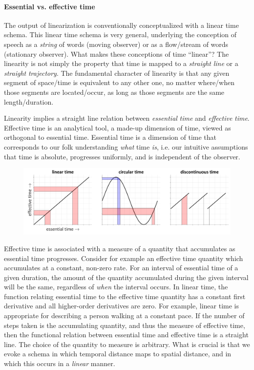 \paragraph{Essential vs. effective time}

The output of linearization is conventionally conceptualized with a linear time schema. This linear time schema is very general, underlying the conception of speech as a \textit{string} of words (moving observer) or as a flow/stream of words (stationary observer). What makes these conceptions of time “linear”?  The linearity is not simply the property that time is mapped to a \textit{straight} \textit{line} or a \textit{straight} \textit{trajectory}. The fundamental character of linearity is that any given segment of space/time is equivalent to any other one, no matter where/when those segments are located/occur, as long as those segments are the same length/duration. 

  Linearity implies a straight line relation between \textit{essential} \textit{time} and \textit{effective} \textit{time}. Effective time is an analytical tool, a made-up dimension of time, viewed as orthogonal to essential time. Essential time is a dimension of time that corresponds to our folk understanding \textit{what} time \textit{is}, i.e. our intuitive assumptions that time is absolute, progresses uniformly, and is independent of the observer.

  
\begin{figure}
\includegraphics[width=\textwidth]{figures/Tilsen-img45.png}
\caption{\missingcaption}
\label{fig:}
\end{figure}
 

  Effective time is associated with a measure of a quantity that accumulates as essential time progresses. Consider for example an effective time quantity which accumulates at a constant, non-zero rate. For an interval of essential time of a given duration, the amount of the quantity accumulated during the given interval will be the same, regardless of \textit{when} the interval occurs. In linear time, the function relating essential time to the effective time quantity has a constant first derivative and all higher-order derivatives are zero. For example, linear time is appropriate for describing a person walking at a constant pace. If the number of steps taken is the accumulating quantity, and thus the measure of effective time, then the functional relation between essential time and effective time is a straight line. The choice of the quantity to measure is arbitrary. What is crucial is that we evoke a schema in which temporal distance maps to spatial distance, and in which this occurs in a \textit{linear} manner.


